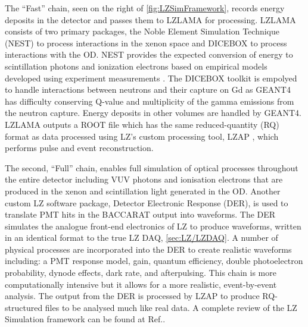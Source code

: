 The ``Fast'' chain, seen on the right of \autoref{fig:LZSimFramework}, records energy deposits in the detector and passes them to LZLAMA for processing. LZLAMA consists of two primary packages, the Noble Element Simulation Technique (NEST) to process interactions in the xenon space and DICEBOX to process interactions with the OD. NEST provides the expected conversion of energy to scintillation photons and ionization electrons based on empirical models developed using experiment measurements \cite{NEST1}. The DICEBOX toolkit is empolyed to handle interactions between neutrons and their capture on Gd as GEANT4 has difficulty conserving Q-value and multiplicity of the gamma emissions from the neutron capture. Energy deposits in other volumes are handled by GEANT4. LZLAMA outputs a ROOT file which has the same reduced-quantity (RQ) format as data processed using LZ's custom processing tool, LZAP \cite{LZ_SIMS}, which performs pulse and event reconstruction.

The second, ``Full'' chain, enables full simulation of optical processes throughout the entire detector including VUV photons and ionisation electrons that are produced in the xenon and scintillation light generated in the OD. Another custom LZ software package, Detector Electronic Response (DER), is used to translate PMT hits in the BACCARAT output into waveforms. The DER simulates the analogue front-end electronics of LZ to produce waveforms, written in an identical format to the true LZ DAQ, \autoref{sec:LZ/LZDAQ}. A number of physical processes are incorporated into the DER to create realistic waveforms including: a PMT response model, gain, quantum efficiency, double photoelectron probability, dynode effects, dark rate, and afterpulsing. This chain is more computationally intensive but it allows for a more realistic, event-by-event analysis. The output from the DER is processed by LZAP to produce RQ-structured files to be analysed much like real data.
A complete review of the LZ Simulation framework can be found at Ref.\cite{LZ_SIMS}.

